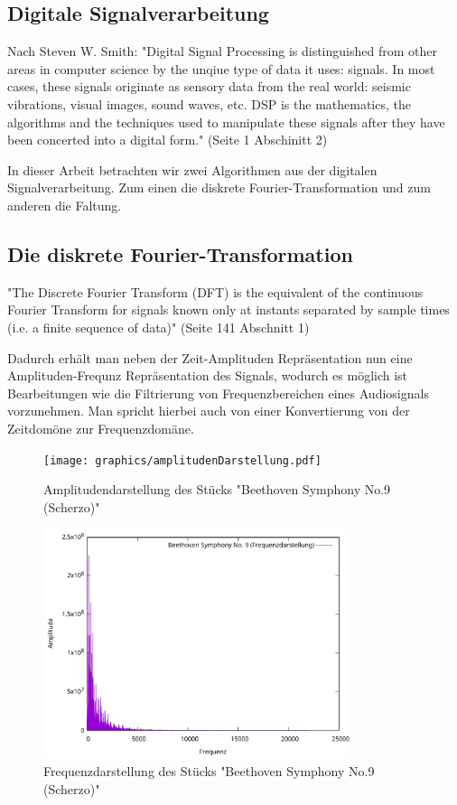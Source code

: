 \documentclass[paper=a4,fontsize=12pt,ngerman]{scrartcl}
\begin{document}
\subsection{Digitale Signalverarbeitung}

Nach Steven W. Smith: "Digital Signal Processing is distinguished from other areas
in computer science by the unqiue type of data it uses: signals. In most cases, these signals originate as sensory data from the real world: seismic vibrations, visual
images, sound waves, etc. DSP is the mathematics, the algorithms and the techniques used to manipulate these signals after they have been concerted into a digital
form."\cite{sws1} (Seite 1 Abschinitt 2)

In dieser Arbeit betrachten wir zwei Algorithmen aus der digitalen Signalverarbeitung. Zum einen die diskrete Fourier-Transformation und zum anderen die Faltung.

\subsection{Die diskrete Fourier-Transformation}

"The Discrete Fourier Transform (DFT) is the equivalent of the continuous Fourier
Transform for signals known only at instants separated by sample times (i.e.
a finite sequence of data)"\cite{roberts_dft_slides} (Seite 141 Abschnitt 1)

Dadurch erhält man neben der Zeit-Amplituden Repräsentation nun eine Amplituden-Frequnz Repräsentation des Signals, wodurch es möglich ist Bearbeitungen wie die Filtrierung von Frequenzbereichen eines Audiosignals vorzunehmen.
Man spricht hierbei auch von einer Konvertierung von der Zeitdomöne zur Frequenzdomäne.

\begin{figure}[H]
    \centering
    \texttt{[image: graphics/amplitudenDarstellung.pdf]}
    \caption{Amplitudendarstellung des Stücks "Beethoven Symphony No.9 (Scherzo)"}
    \label{fig:scherzo-amplitude}
\end{figure}

\begin{figure}[H]
    \centering
    \includegraphics[width=0.8\textwidth]{graphics/frequnzDarstellung.pdf}
    \caption{Frequenzdarstellung des Stücks "Beethoven Symphony No.9 (Scherzo)"}
    \label{fig:scherzo-frequenz}
\end{figure}
\end{document}
